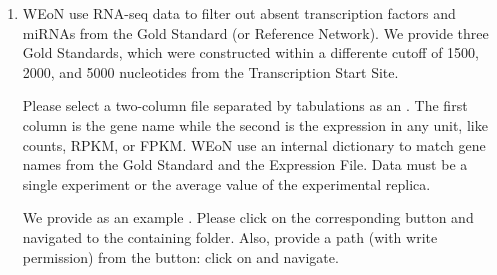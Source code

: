 \documentclass[letterpaper,10pt,english]{sphinxmanual}
\begin{document}
\begin{enumerate}
\def\theenumi{\arabic{enumi}}
\def\labelenumi{\theenumi .}
\makeatletter\def\p@enumii{\p@enumi \theenumi .}\makeatother
\setcounter{enumi}{1}
\item {} 

WEoN use RNA-seq data to filter out absent transcription factors and miRNAs
from the Gold Standard (or Reference Network). We provide three Gold Standards,
which were constructed within a differente cutoff of 1500, 2000, and 5000
nucleotides from the Transcription Start Site.

Please select a two-column file separated by tabulations as an .
The first column is the gene name while the second is the expression in any
unit, like counts, RPKM, or FPKM. WEoN use an internal dictionary to match gene
names from the Gold Standard and the Expression File. Data must be a single
experiment or the average value of the experimental replica.

We provide  as an example . Please
click on the corresponding  button and navigated to the containing
folder. Also, provide a path (with write permission) from the 
button: click on and navigate.

\end{enumerate}
\end{document}
